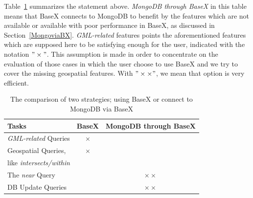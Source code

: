 \documentclass[a4paper,12pt]{article}
\begin{document}


Table~\ref{t.comparisonBaseXMongo} summarizes the statement above. \textit{MongoDB through BaseX} in this table means that BaseX connects to MongoDB to benefit by the features which are not available or available with poor performance in BaseX, as discussed in Section~\ref{MongoviaBX}. \textit{GML-related} features points the aforementioned features which are supposed here to be satisfying enough for the user, indicated with the notation $"\times"$. This assumption is made in order to concentrate on the evaluation of those cases in which the user choose to use BaseX and we try to cover the missing geospatial features.
With $"\times\times"$, we mean that option is very efficient.
\vspace{10px}
\begin{table}
\centering
\begin{tabular}{|l | c | c|}\hline
\textbf{Tasks} & \textbf{BaseX} & \textbf{MongoDB through BaseX}\\\hline
 \textit{GML-related} Queries & $\times$ &\\\hline
 Geospatial Queries,  & $\times$ &\\
like \textit{intersects/within} & & \\\hline
 The \textit{near} Query & &$\times\times$ \\\hline
 DB Update Queries & &$\times\times$ 
\\\hline
\end{tabular}
\caption{The comparison of two strategies; using BaseX or connect to MongoDB via BaseX}
\label{t.comparisonBaseXMongo}
\end{table}
\vspace{10px}
\end{document}
